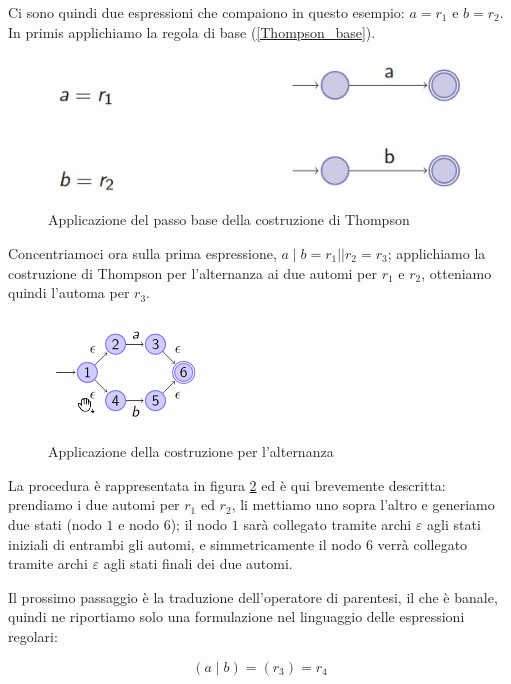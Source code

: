 \documentclass[class=book, crop=false, oneside, 12pt]{standalone}
\begin{document}
\noindent Ci sono quindi due espressioni che compaiono in questo esempio: \(a = r_1\) e \(b = r_2\).
In primis applichiamo la regola di base (\ref{Thompson_base}).

\begin{figure}
    \centering
    \includegraphics[width=.7\textwidth,keepaspectratio]{esempio_Thompson_0}
    \caption{Applicazione del passo base della costruzione di Thompson}
    \label{esempio_Thompson_0}
\end{figure}

Concentriamoci ora sulla prima espressione, \( a \mid b = r_1 |\mid r_2 = r_3\); applichiamo la costruzione di Thompson per l’alternanza ai due automi per \(r_1\) e \(r_2\), otteniamo quindi l’automa per \(r_3\).

\begin{figure}
    \centering
    \includegraphics[width=.4\textwidth,keepaspectratio]{esempio_Thompson_1}
    \caption{Applicazione della costruzione per l'alternanza}
    \label{esempio_Thompson_1}
\end{figure}

La procedura è rappresentata in figura \ref{esempio_Thompson_1} ed è qui brevemente descritta: prendiamo i due automi per \(r_1\) ed \(r_2\), li mettiamo uno sopra l’altro e generiamo due stati (nodo \(1\) e nodo \(6\)); il nodo \(1\) sarà collegato tramite archi \(\varepsilon\) agli stati iniziali di entrambi gli automi, e simmetricamente il nodo \(6\) verrà collegato tramite archi \(\varepsilon\) agli stati finali dei due automi.

Il prossimo passaggio è la traduzione dell'operatore di parentesi, il che è banale, quindi ne riportiamo solo una formulazione nel linguaggio delle espressioni regolari:

\begin{equation*}
    (a \mid b)=(r_3)=r_4
\end{equation*}
\end{document}
